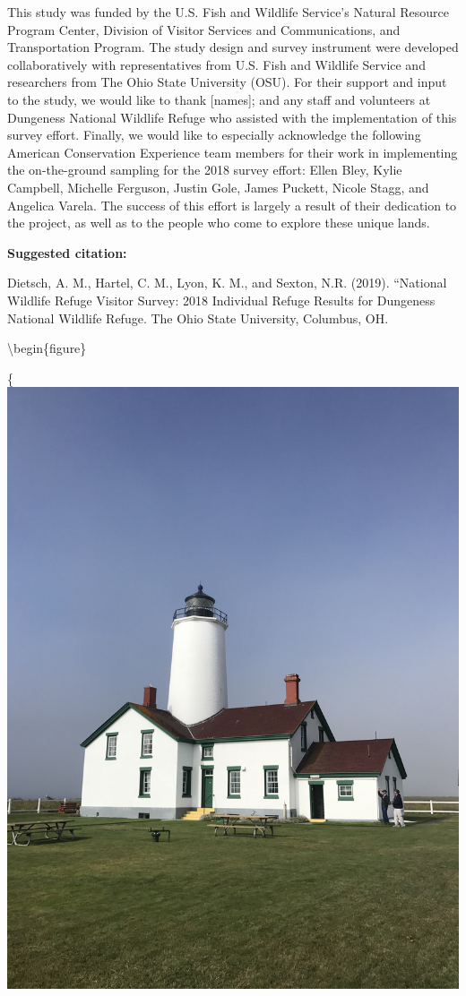 \documentclass[]{book}
\begin{document}
This study was funded by the U.S. Fish and Wildlife Service's Natural
Resource Program Center, Division of Visitor Services and
Communications, and Transportation Program. The study design and survey
instrument were developed collaboratively with representatives from U.S.
Fish and Wildlife Service and researchers from The Ohio State University
(OSU). For their support and input to the study, we would like to thank
{[}names{]}; and any staff and volunteers at Dungeness National Wildlife
Refuge who assisted with the implementation of this survey effort.
Finally, we would like to especially acknowledge the following American
Conservation Experience team members for their work in implementing the
on-the-ground sampling for the 2018 survey effort: Ellen Bley, Kylie
Campbell, Michelle Ferguson, Justin Gole, James Puckett, Nicole Stagg,
and Angelica Varela. The success of this effort is largely a result of
their dedication to the project, as well as to the people who come to
explore these unique lands.

\textbf{Suggested citation:}

Dietsch, A. M., Hartel, C. M., Lyon, K. M., and Sexton, N.R. (2019).
``National Wildlife Refuge Visitor Survey: 2018 Individual Refuge
Results for Dungeness National Wildlife Refuge. The Ohio State
University, Columbus, OH.

\textbackslash{}begin\{figure\}

\{\centering \includegraphics[width=42in,keepaspectratio]{refuge-info/Dungeness National Wildlife Refuge/image1}
\end{document}
